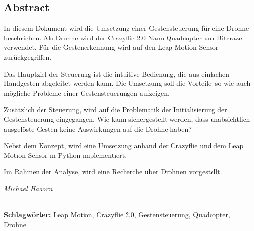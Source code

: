 
\subsection*{Abstract}
In diesem Dokument wird die Umsetzung einer Gestensteuerung für eine Drohne beschrieben. Als Drohne wird der Crazyflie 2.0 Nano Quadcopter von Bitcraze verwendet. Für die Gestenerkennung wird auf den Leap Motion Sensor zurückgegriffen.

Das Hauptziel der Steuerung ist die intuitive Bedienung, die aus einfachen Handgesten abgeleitet werden kann. Die Umsetzung soll die Vorteile, so wie auch mögliche Probleme einer Gestensteuerungen aufzeigen.

Zusätzlich der Steuerung, wird auf die Problematik der Initialisierung der Gestensteuerung eingegangen. Wie kann sichergestellt werden, dass unabsichtlich ausgelöste Gesten keine Auswirkungen auf die Drohne haben?

Nebst dem Konzept, wird eine Umsetzung anhand der Crazyflie und dem Leap Motion Sensor in Python implementiert.

Im Rahmen der Analyse, wird eine Recherche über Drohnen vorgestellt.

\begin{flushright}
	\textit{Michael Hadorn}	
\end{flushright}

\vfill

%
\mbox{}\\[0.5\baselineskip]\noindent
\textbf{Schlagwörter:} 
Leap Motion, Crazyflie 2.0, Gestensteuerung, Quadcopter, Drohne

\newpage
